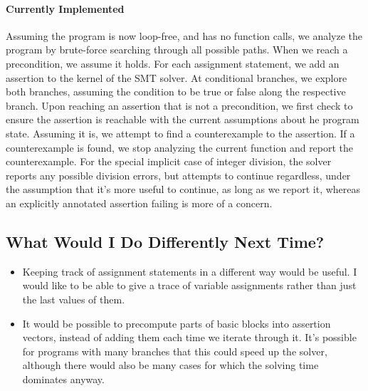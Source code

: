 \documentclass[12pt]{article}
\begin{document}
\paragraph{Currently Implemented}
Assuming the program is now loop-free, and has no function calls, we analyze the program by brute-force searching through all possible paths. When we reach a precondition, we assume it holds. For each assignment statement, we add an assertion to the kernel of the SMT solver. At conditional branches, we explore both branches, assuming the condition to be true or false along the respective branch. Upon reaching an assertion that is not a precondition, we first check to ensure the assertion is reachable with the current assumptions about he program state. Assuming it is, we attempt to find a counterexample to the assertion. If a counterexample is found, we stop analyzing the current function and report the counterexample. For the special implicit case of integer division, the solver reports any possible division errors, but attempts to continue regardless, under the assumption that it's more useful to continue, as long as we report it, whereas an explicitly annotated assertion failing is more of a concern.



\subsection{What Would I Do Differently Next Time?}
\begin{itemize}
  \item Keeping track of assignment statements in a different way would be useful. I would like to be able to give a trace of variable assignments rather than just the last values of them.
  \item It would be possible to precompute parts of basic blocks into assertion vectors, instead of adding them each time we iterate through it. It's possible for programs with many branches that this could speed up the solver, although there would also be many cases for which the solving time dominates anyway.
\end{itemize}
\end{document}
